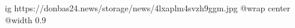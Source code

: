  
 
 
 
 

\ifcmt
  ig https://donbas24.news/storage/news/4lxaplm4svzh9ggm.jpg
  @wrap center
  @width 0.9
\fi
